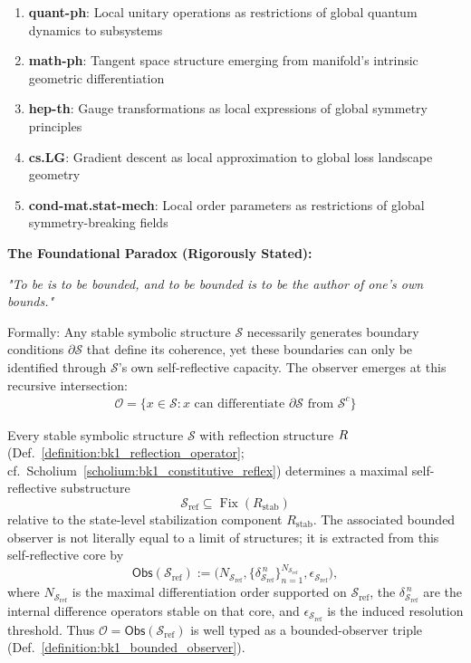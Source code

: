 \begin{scholium}
\begin{enumerate}
\textbf{Cross-Field Manifestations:}
\begin{enumerate}
    \item 
\end{enumerate}
\item \textbf{quant-ph}: Local unitary operations as restrictions of global quantum dynamics to subsystems
\item \textbf{math-ph}: Tangent space structure emerging from manifold's intrinsic geometric differentiation
\item \textbf{hep-th}: Gauge transformations as local expressions of global symmetry principles
\item \textbf{cs.LG}: Gradient descent as local approximation to global loss landscape geometry
\item \textbf{cond-mat.stat-mech}: Local order parameters as restrictions of global symmetry-breaking fields
\end{enumerate}

\textbf{The Foundational Paradox (Rigorously Stated):}
\begin{center}
\textit{"To be is to be bounded, and to be bounded is to be the author of one's own bounds."}
\end{center}

Formally: Any stable symbolic structure $\mathcal{S}$ necessarily generates boundary conditions $\partial \mathcal{S}$ that define its coherence, yet these boundaries can only be identified through $\mathcal{S}$'s own self-reflective capacity. The observer emerges at this recursive intersection:
\begin{align}
\mathcal{O} = \{x \in \mathcal{S} : x \text{ can differentiate } \partial \mathcal{S} \text{ from } \mathcal{S}^c\}
\end{align}

\begin{theorem}
\label{theorem:bk1_constitutive_bootstrap}
Every stable symbolic structure $\mathcal{S}$ with reflection structure
\(R\) (Def.~\ref{definition:bk1_reflection_operator};
cf.~Scholium~\ref{scholium:bk1_constitutive_reflex}) determines a maximal
self-reflective substructure
\[
\mathcal{S}_{\mathrm{ref}}
\subseteq
\operatorname{Fix}(R_{\mathrm{stab}})
\]
relative to the state-level stabilization component \(R_{\mathrm{stab}}\).
The associated bounded observer is not literally equal to a limit of structures;
it is extracted from this self-reflective core by
\[
\mathsf{Obs}(\mathcal{S}_{\mathrm{ref}})
:=
\bigl(
N_{\mathcal{S}_{\mathrm{ref}}},
\{\delta_{\mathcal{S}_{\mathrm{ref}}}^{\,n}\}_{n=1}^{N_{\mathcal{S}_{\mathrm{ref}}}},
\epsilon_{\mathcal{S}_{\mathrm{ref}}}
\bigr),
\]
where \(N_{\mathcal{S}_{\mathrm{ref}}}\) is the maximal differentiation order
supported on \(\mathcal{S}_{\mathrm{ref}}\), the
\(\delta_{\mathcal{S}_{\mathrm{ref}}}^{\,n}\) are the internal difference
operators stable on that core, and \(\epsilon_{\mathcal{S}_{\mathrm{ref}}}\)
is the induced resolution threshold. Thus \(\mathcal{O}
=\mathsf{Obs}(\mathcal{S}_{\mathrm{ref}})\) is well typed as a bounded-observer
triple (Def.~\ref{definition:bk1_bounded_observer}).


\end{theorem}
\end{scholium}

